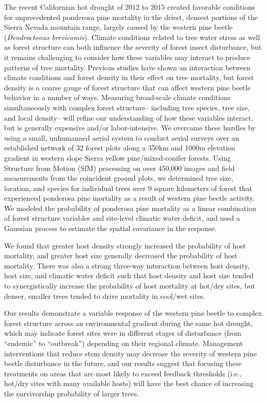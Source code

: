 \documentclass[]{article}
\begin{document}
The recent Californian hot drought of 2012 to 2015 created favorable
conditions for unprecedented ponderosa pine mortality in the driest,
densest portions of the Sierra Nevada mountain range, largely caused by
the western pine beetle (\emph{Dendroctonus brevicomis}). Climate
conditions related to tree water stress as well as forest structure can
both influence the severity of forest insect disturbance, but it remains
challenging to consider how these variables may interact to produce
patterns of tree mortality. Previous studies have shown an interaction
between climate conditions and forest density in their effect on tree
mortality, but forest density is a coarse gauge of forest structure that
can affect western pine beetle behavior in a number of ways. Measuring
broad-scale climate conditions simultaneously with complex forest
structure-- including tree species, tree size, and local density-- will
refine our understanding of how these variables interact, but is
generally expensive and/or labor-intensive. We overcame these hurdles by
using a small, unhumanned aerial system to conduct aerial surveys over
an established network of 32 forest plots along a 350km and 1000m
elevation gradient in western slope Sierra yellow pine/mixed-conifer
forests. Using Structure from Motion (SfM) processing on over 450,000
images and field measurements from the coincident ground plots, we
determined tree size, location, and species for individual trees over 9
square kilometers of forest that experienced ponderosa pine mortality as
a result of western pine beetle activity. We modeled the probability of
ponderosa pine mortality as a linear combination of forest structure
variables and site-level climatic water deficit, and used a Gaussian
process to estimate the spatial covariance in the response.

We found that greater host density strongly increased the probability of
host mortality, and greater host size generally decreased the
probability of host mortality. There was also a strong three-way
interaction between host density, host size, and climatic water deficit
such that host density and host size tended to synergistically increase
the probability of host mortality at hot/dry sites, but denser, smaller
trees tended to drive mortality in cool/wet sites.

Our results demonstrate a variable response of the western pine beetle
to complex forest structure across an environmental gradient during the
same hot drought, which may indicate forest sites were in different
stages of disturbance (from ``endemic'' to ``outbreak'') depending on
their regional climate. Management interventions that reduce stem
density may decrease the severity of western pine beetle disturbance in
the future, and our results suggest that focusing these treatments on
areas that are most likely to exceed feedback thresholds (i.e., hot/dry
sites with many available hosts) will have the best chance of increasing
the survivorship probability of larger trees.
\end{document}

